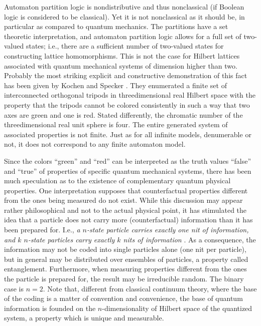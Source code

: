 Automaton partition logic is nondistributive and thus nonclassical (if Boolean logic is considered
to be classical).
Yet it is not nonclassical as it should be, in particular as compared to quantum mechanics.
The partitions have a set theoretic interpretation,
and automaton partition logic allows for a full set of two-valued states;
i.e., there are a sufficient number of two-valued states for constructing
lattice homomorphisms.
This is not the case for Hilbert lattices associated with quantum mechanical
systems of dimension higher than two.
Probably the most striking explicit and constructive demonstration of this fact
has been given by Kochen and Specker \cite{kochen1}.
They enumerated a finite set of interconnected orthogonal tripods
in threedimensional real Hilbert space
with the property that the tripods cannot be colored
consistently in such a way that two axes are green and one is red.
Stated differently, the chromatic number of the threedimensional real unit sphere is four.
The entire generated system of associated properties is not finite.
Just as for all infinite models, denumerable or not,
it does not correspond to any finite automaton model.

Since the colors ``green'' and ``red'' can be interpreted as the truth values
``false'' and ``true'' of properties of specific quantum mechanical systems,
there has been much speculation as to the existence of complementary quantum physical properties.
One interpretation supposes that counterfactual properties
different from the ones being measured do not exist.
While this discussion may appear rather philosophical and not to the actual physical point,
it has stimulated the idea that a particle does not carry more (counterfactual)
information than it has been prepared for.
I.e., {\em a $n$-state particle carries exactly one nit of information,
and $k$ $n$-state particles carry exactly $k$ nits of information}
\cite{zeil-99,DonSvo01,svozil-2002-statepart-prl}.
As a consequence, the information may not be coded into single particles alone (one nit per particle),
but in general may be distributed over ensembles of particles, a property called entanglement.
Furthermore, when measuring properties different from the ones the particle is
prepared for, the result may be irreducible random.
The binary case is $n=2$. Note that, different from classical continuum theory,
where the base of the coding is a matter
of convention and convenience, the base of quantum information
is founded on the $n$-dimensionality of Hilbert space of the quantized system,
a property which is unique and measurable.

